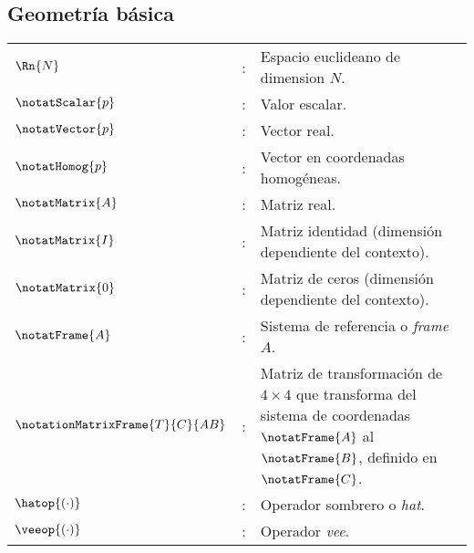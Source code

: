 \begin{notation}
\renewcommand\arraystretch{1.5}

\section*{Geometría básica}
\begin{center}
	\begin{tabular}{l c p{12cm}}
		$\Rn{N}$ 							& : & Espacio euclideano de dimension $N$.
		\\ 
		$\notatScalar{p}$ 					& : & Valor escalar.
		\\ 
		$\notatVector{p}$ 					& : & Vector real.
		\\
		$\notatHomog{p}$ 					& : & Vector en coordenadas homogéneas.
		\\
		$\notatMatrix{A}$ 					& : & Matriz real.
		\\
		$\notatMatrix{I}$ 					& : & Matriz identidad (dimensión dependiente del contexto).
		\\
		$\notatMatrix{0}$					& : & Matriz de ceros (dimensión dependiente del contexto).
		\\
		$\notatFrame{A}$					& : & Sistema de referencia o \emph{frame} $A$.
		\\
		$\notationMatrixFrame{T}{C}{AB}$			& : & Matriz de transformación de $4\times4$ que transforma del sistema de coordenadas $\notatFrame{A}$ al $\notatFrame{B}$, definido en $\notatFrame{C}$.
		\\
		$\hatop{\left(\cdot\right)}$			& : & Operador sombrero o \emph{hat}.
		\\
		$\veeop{\left(\cdot\right)}$			& : & Operador \emph{vee}.
		\\
	\end{tabular} 
\end{center}


\end{notation}
